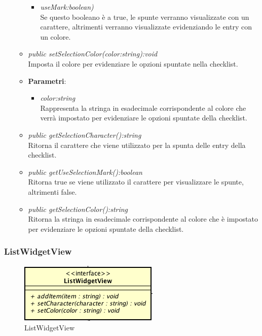 \begin{itemize}
\begin{itemize}
{\begin{itemize}
		\item \textit{useMark:boolean)}\\
		Se questo booleano è a true, le spunte verranno visualizzate con un carattere, altrimenti verranno visualizzate evidenziando le entry con un colore.
		\end{itemize}}
	\item \textit{public setSelectionColor(color:string):void}\\
	Imposta il colore per evidenziare le opzioni spuntate nella checklist.
		\item{\textbf{Parametri}: \begin{itemize}
		\item \textit{color:string}\\
		Rappresenta la stringa in esadecimale corrispondente al colore che verrà impostato per evidenziare le opzioni spuntate della checklist.
		\end{itemize}}
	\item \textit{public getSelectionCharacter():string}\\
	Ritorna il carattere che viene utilizzato per la spunta delle entry della checklist.
	\item \textit{public getUseSelectionMark():boolean}\\
	Ritorna true se viene utilizzato il carattere per visualizzare le spunte, altrimenti false.
	\item \textit{public getSelectionColor():string}\\
	Ritorna la stringa in esadecimale corrispondente al colore che è impostato per evidenziare le opzioni spuntate della checklist.
	\end{itemize}
\end{itemize}

\subsubsection{ListWidgetView}

\label{ListWidgetView}
\begin{figure}[ht]
	\centering
	\includegraphics[scale=0.5]{Sezioni/SottosezioniST/img/ListWidgetView.png}
	\caption{ListWidgetView}
\end{figure}

